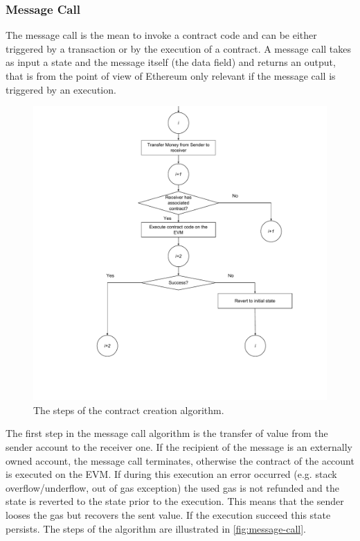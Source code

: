 \subsubsection{Message Call}
\label{sec:message-call}
The message call is the mean to invoke a contract code and can be either
triggered by a transaction or by the execution of a contract.
A message call takes as input a state and the message itself (the data field)
and returns an output, that is from the point of view of Ethereum only 
relevant if the message call is triggered by an execution.

\begin{figure}
	\begin{center}
		\includegraphics[width=\textwidth]{./res/img/message-call.pdf}
	\end{center}
	\caption{The steps of the contract creation algorithm.}
	\label{fig:message-call}
\end{figure}

The first step in the message call algorithm is the transfer of value from the
sender account to the receiver one. If the recipient of the message is
an externally owned account, the message call terminates, otherwise the contract
of the account is executed on the EVM. 
If during this execution an error occurred (e.g. stack overflow/underflow,
out of gas exception) the used gas is not refunded and the state is reverted 
to the state prior to the execution. This means that the sender
looses the gas but recovers the sent value. If the execution succeed this state
persists.
The steps of the algorithm are illustrated in \autoref{fig:message-call}.